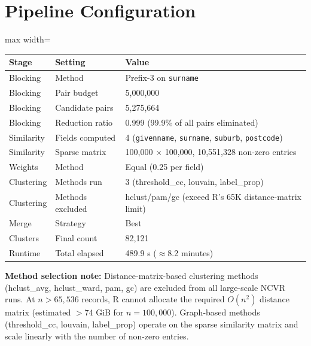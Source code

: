 \documentclass[11pt, a4paper]{article}
\begin{document}
\section{Pipeline Configuration}

\begin{table}[h!]
\centering
\begin{adjustbox}{max width=\linewidth}
\begin{tabular}{lll}
\toprule
\textbf{Stage} & \textbf{Setting} & \textbf{Value} \\
\midrule
Blocking   & Method           & Prefix-3 on \texttt{surname} \\
Blocking   & Pair budget      & 5,000,000 \\
Blocking   & Candidate pairs  & 5,275,664 \\
Blocking   & Reduction ratio  & 0.999 (99.9\% of all pairs eliminated) \\
Similarity & Fields computed  & 4 (\texttt{givenname}, \texttt{surname}, \texttt{suburb}, \texttt{postcode}) \\
Similarity & Sparse matrix    & 100,000 $\times$ 100,000, 10,551,328 non-zero entries \\
Weights    & Method           & Equal (0.25 per field) \\
Clustering & Methods run      & 3 (threshold\_cc, louvain, label\_prop) \\
Clustering & Methods excluded & hclust/pam/gc (exceed R's 65K distance-matrix limit) \\
Merge      & Strategy         & Best \\
Clusters   & Final count      & 82,121 \\
Runtime    & Total elapsed    & 489.9 s ($\approx$8.2 minutes) \\
\bottomrule
\end{tabular}
\end{adjustbox}
\end{table}

\textbf{Method selection note:} Distance-matrix-based clustering methods
(hclust\_avg, hclust\_ward, pam, gc) are excluded from all large-scale NCVR runs.
At $n > 65{,}536$ records, R cannot allocate the required $O(n^2)$ distance matrix
(estimated $>$74 GiB for $n = 100{,}000$). Graph-based methods (threshold\_cc,
louvain, label\_prop) operate on the sparse similarity matrix and scale linearly
with the number of non-zero entries.
\end{document}
